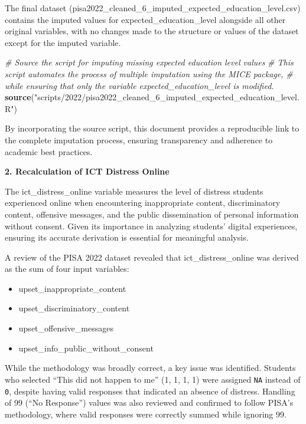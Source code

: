 \documentclass[
]{article}
\newenvironment{Shaded}{\begin{snugshade}}{\end{snugshade}}
\newcommand{\CommentTok}[1]{\textcolor[rgb]{0.56,0.35,0.01}{\textit{#1}}}
\newcommand{\FunctionTok}[1]{\textcolor[rgb]{0.13,0.29,0.53}{\textbf{#1}}}
\newcommand{\NormalTok}[1]{#1}
\newcommand{\StringTok}[1]{\textcolor[rgb]{0.31,0.60,0.02}{#1}}
\begin{document}
The final dataset
(pisa2022\_cleaned\_6\_imputed\_expected\_education\_level.csv) contains
the imputed values for expected\_education\_level alongside all other
original variables, with no changes made to the structure or values of
the dataset except for the imputed variable.

\begin{Shaded}
\begin{Highlighting}[]
\CommentTok{\# Source the script for imputing missing expected education level values}
\CommentTok{\# This script automates the process of multiple imputation using the MICE package,}
\CommentTok{\# while ensuring that only the variable \textasciigrave{}expected\_education\_level\textasciigrave{} is modified.}
\FunctionTok{source}\NormalTok{(}\StringTok{"scripts/2022/pisa2022\_cleaned\_6\_imputed\_expected\_education\_level.R"}\NormalTok{)}
\end{Highlighting}
\end{Shaded}

By incorporating the source script, this document provides a
reproducible link to the complete imputation process, ensuring
transparency and adherence to academic best practices.

\textbf{2. Recalculation of ICT Distress Online}

The ict\_distress\_online variable measures the level of distress
students experienced online when encountering inappropriate content,
discriminatory content, offensive messages, and the public dissemination
of personal information without consent. Given its importance in
analyzing students' digital experiences, ensuring its accurate
derivation is essential for meaningful analysis.

A review of the PISA 2022 dataset revealed that ict\_distress\_online
was derived as the sum of four input variables:

\begin{itemize}
\item
  upset\_inappropriate\_content
\item
  upset\_discriminatory\_content
\item
  upset\_offensive\_messages
\item
  upset\_info\_public\_without\_consent
\end{itemize}

While the methodology was broadly correct, a key issue was identified.
Students who selected ``This did not happen to me'' (1, 1, 1, 1) were
assigned \texttt{NA} instead of \texttt{0}, despite having valid
responses that indicated an absence of distress. Handling of 99 (``No
Response'') values was also reviewed and confirmed to follow PISA's
methodology, where valid responses were correctly summed while ignoring
99.
\end{document}
